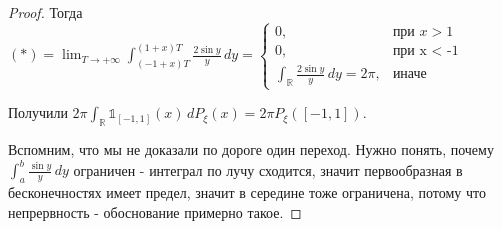 \begin{proof}
    Тогда $(*) = \lim_{T \to +\infty} \int_{(-1 + x)T}^{(1 + x)T} \frac{2 \sin y}{y} \, dy = \begin{cases}
        0, & \text{при $x > 1$} \\
        0, & \text{при x < -1} \\
        \int_{\mathbb{R}} \frac{2 \sin y}{y} \, dy = 2\pi, & \text{иначе}
    \end{cases}$

    Получили $2\pi \int_{\mathbb{R}} \mathds{1}_{[-1, 1]} (x) \, dP_{\xi} (x) = 2\pi P_{\xi}([-1, 1])$.

    Вспомним, что мы не доказали по дороге один переход. Нужно понять, почему $\int_{a}^b \frac{\sin y}{y} \, dy$ ограничен - интеграл по лучу сходится, значит первообразная 
    в бесконечностях имеет предел, значит в середине тоже ограничена, потому что непрервность - обоснование примерно такое. 

\end{proof}

